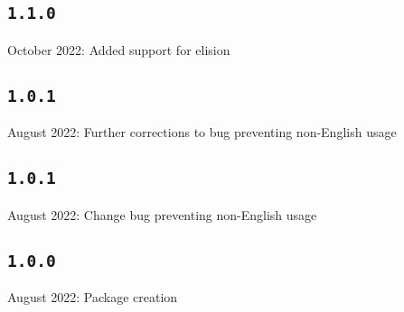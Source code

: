 \documentclass{article}
\begin{document}
\subsection{\normalfont\texttt{1.1.0}}
 October 2022: Added support for elision


\subsection{\normalfont\texttt{1.0.1}}



 August 2022: Further corrections to bug preventing non-English usage

\subsection{\normalfont\texttt{1.0.1}}

 August 2022: Change bug preventing non-English usage


\subsection{\normalfont\texttt{1.0.0}}

 August 2022: Package creation

	
\end{document}
